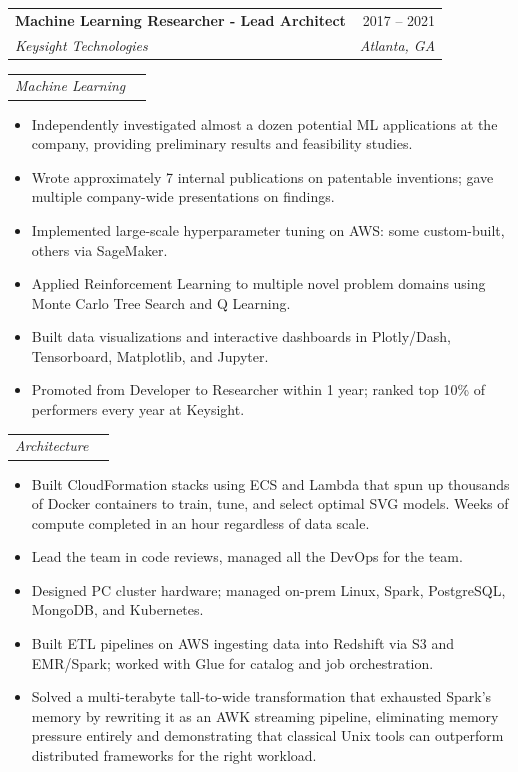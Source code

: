 \documentclass[letterpaper,11pt]{article}
\makeatletter
\newcommand{\resumeItem}[1]{
  \item\small{
    {#1 \vspace{-2pt}}
  }
}
\newcommand{\resumeSubheading}[4]{
  \vspace{-2pt}\item
    \begin{tabular*}{0.97\textwidth}[t]{l@{\extracolsep{\fill}}r}
      \textbf{#1} & #2 \\
      \textit{\small#3} & \textit{\small #4} \\
    \end{tabular*}\vspace{-7pt}
}
\newcommand{\resumeSubSubheading}[2]{
    \item
    \begin{tabular*}{0.97\textwidth}{l@{\extracolsep{\fill}}r}
      \textit{\small#1} & \textit{\small #2} \\
    \end{tabular*}\vspace{-7pt}
}
\newcommand{\resumeSubHeadingListEnd}{\end{itemize}}
\newcommand{\resumeItemListStart}{\begin{itemize}}
\newcommand{\resumeItemListEnd}{\end{itemize}\vspace{-5pt}}
\makeatother
\begin{document}
    \resumeSubheading
      {Machine Learning Researcher - Lead Architect}{2017 -- 2021}
      {Keysight Technologies}{Atlanta, GA}
      \resumeSubSubheading
      {Machine Learning}{}
      \resumeItemListStart
        \resumeItem{Independently investigated almost a dozen potential ML
          applications at the company, providing preliminary results and
          feasibility studies.}
        \resumeItem{Wrote approximately 7 internal publications on patentable
          inventions; gave multiple company-wide presentations on findings.}
        \resumeItem{Implemented large-scale hyperparameter tuning on AWS: some custom-built, others via SageMaker.}
        \resumeItem{Applied Reinforcement Learning to multiple novel problem
          domains using Monte Carlo Tree Search and Q Learning.}
        \resumeItem{Built data visualizations and interactive dashboards in Plotly/Dash, Tensorboard, Matplotlib, and Jupyter.}
        \resumeItem{Promoted from Developer to Researcher within 1 year; ranked top 10\% of performers every year at Keysight.}
      \resumeItemListEnd
      \resumeSubSubheading
      {Architecture}{}
      \resumeItemListStart
        \resumeItem{Built CloudFormation stacks using ECS and Lambda that spun up
          thousands of Docker containers to train, tune, and select optimal SVG models.
          Weeks of compute completed in an hour regardless of data scale.}
        \resumeItem{Lead the team in code reviews, managed all the DevOps for
          the team.}
        \resumeItem{Designed PC cluster hardware; managed on-prem Linux, Spark, PostgreSQL, MongoDB, and Kubernetes.}
        \resumeItem{Built ETL pipelines on AWS ingesting data into Redshift via S3 and EMR/Spark; worked with Glue for catalog and job orchestration.}
        \resumeItem{Solved a multi-terabyte tall-to-wide transformation that exhausted Spark's memory by rewriting it as an AWK streaming pipeline, eliminating memory pressure entirely and demonstrating that classical Unix tools can outperform distributed frameworks for the right workload.}
      \resumeItemListEnd



\end{document}
